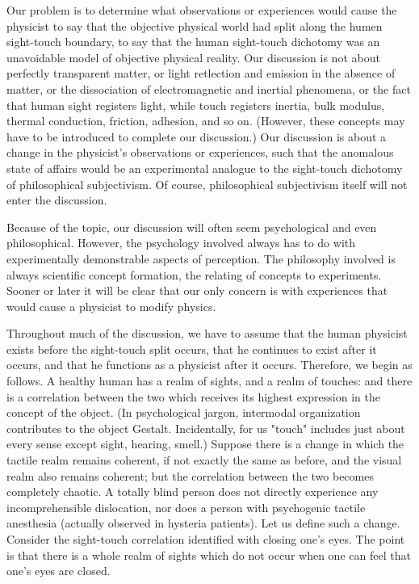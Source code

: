 \documentclass[10pt,twoside]{memoir}
\begin{document}
\begin{enumerate}
{\begin{enumerate}
Our problem is to determine what observations or experiences would 
cause the physicist to say that the objective physical world had split along 
the humen sight-touch boundary, to say that the human sight-touch 
dichotomy was an unavoidable model of objective physical reality. Our 
discussion is not about perfectly transparent matter, or light retlection and 
emission in the absence of matter, or the dissociation of electromagnetic and 
inertial phenomena, or the fact that human sight registers light, while touch 
registers inertia, bulk modulus, thermal conduction, friction, adhesion, and 
so on. (However, these concepts may have to be introduced to complete our 
discussion.) Our discussion is about a change in the physicist's observations 
or experiences, such that the anomalous state of affairs would be an 
experimental analogue to the sight-touch dichotomy of philosophical 
subjectivism. Of course, philosophical subjectivism itself will not enter the 
discussion. 

Because of the topic, our discussion will often seem psychological and 
even philosophical. However, the psychology involved always has to do with 
experimentally demonstrable aspects of perception. The philosophy involved 
is always scientific concept formation, the relating of concepts to 
experiments. Sooner or later it will be clear that our only concern is with 
experiences that would cause a physicist to modify physics. 

Throughout much of the discussion, we have to assume that the human 
physicist exists before the sight-touch split occurs, that he continues to exist 
after it occurs, and that he functions as a physicist after it occurs. Therefore, 
we begin as follows. A healthy human has a realm of sights, and a realm of 
touches: and there is a correlation between the two which receives its highest 
expression in the concept of the object. (In psychological jargon, intermodal 
organization contributes to the object Gestalt. Incidentally, for us "touch" 
includes just about every sense except sight, hearing, smell.) Suppose there is 
a change in which the tactile realm remains coherent, if not exactly the same 
as before, and the visual realm also remains coherent; but the correlation 
between the two becomes completely chaotic. A totally blind person does 
not directly experience any incomprehensible dislocation, nor does a person 
with psychogenic tactile anesthesia (actually observed in hysteria patients). 
Let us define such a change. Consider the sight-touch correlation identified 
with closing one's eyes. The point is that there is a whole realm of sights 
which do not occur when one can feel that one's eyes are closed. 


\end{enumerate}}
\end{enumerate}
\end{document}
